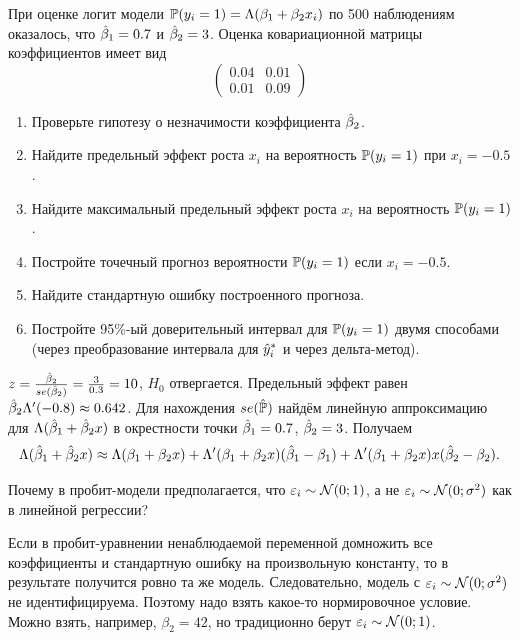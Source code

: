 \begin{problem}
При оценке логит модели
\(
\P(y_i=1)=\Lambda(\beta_1+\beta_2 x_i)
\)
по 500 наблюдениям оказалось, что $\hb_1=0.7$ и $\hb_2=3$. 
Оценка ковариационной матрицы коэффициентов имеет вид
\[
\begin{pmatrix}
  0.04 & 0.01 \\
  0.01 & 0.09
\end{pmatrix}
\]

\begin{enumerate}
\item Проверьте гипотезу о незначимости коэффициента $\hb_2$.
\item Найдите предельный эффект роста $x_i$ на вероятность $\P(y_i=1)$ при $x_i=-0.5$.
\item Найдите максимальный предельный эффект роста $x_i$ на вероятность $\P(y_i=1)$.
\item Постройте точечный прогноз вероятности $\P(y_i=1)$ если $x_i = -0.5$.
\item Найдите стандартную ошибку построенного прогноза.
\item Постройте 95\%-ый доверительный интервал для $\P(y_i=1)$ двумя способами (через преобразование интервала для $\hy_i^*$ и через дельта-метод).
\end{enumerate}
\begin{sol}
$z = \frac{\hb_2}{se(\hb_2)}=\frac{3}{0.3}=10$, $H_0$ отвергается.
Предельный эффект равен $\hb_2 \Lambda'(-0.8)\approx 0.642$.
Для нахождения $se(\hat\P)$ найдём линейную аппроксимацию для $\Lambda(\hb_1 + \hb_2 x)$ в окрестности точки $\hb_1=0.7$, $\hb_2=3$. Получаем
\[
\Lambda(\hb_1 + \hb_2 x) \approx \Lambda(\beta_1 + \beta_2 x) + \Lambda'(\beta_1 + \beta_2 x) (\hb_1 - \beta_1) + \Lambda'(\beta_1 + \beta_2 x)x(\hb_2 - \beta_2).
\]
\end{sol}
\end{problem}


\begin{problem}
Почему в пробит-модели предполагается, что $\e_i \sim \cN(0;1)$, а не $\e_i \sim \cN(0;\sigma^2)$ как в линейной регрессии?
\begin{sol}
Если в пробит-уравнении ненаблюдаемой переменной домножить все коэффициенты и стандартную ошибку на произвольную константу, 
то в результате получится ровно та же модель. 
Следовательно, модель с $\e_i \sim \cN(0;\sigma^2)$ не идентифицируема. 
Поэтому надо взять какое-то нормировочное условие. 
Можно взять, например, $\beta_2 = 42$, но традиционно берут $\e_i \sim \cN(0;1)$.
\end{sol}
\end{problem}



